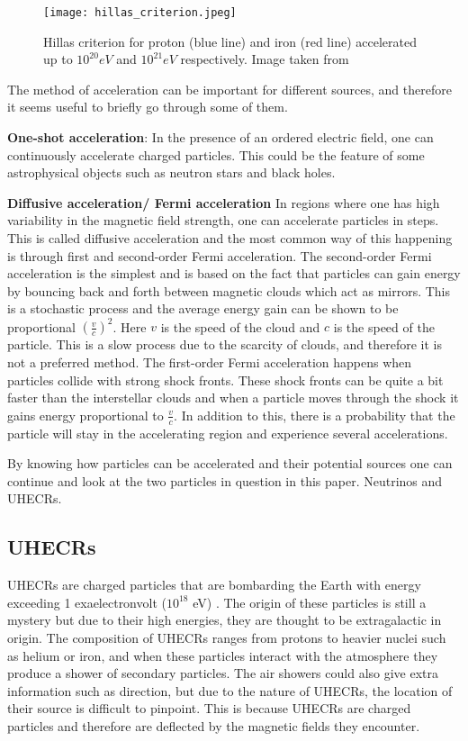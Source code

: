 \begin{figure}
    \centering
    \texttt{[image: hillas\_criterion.jpeg]}
    \caption{Hillas criterion for proton (blue line) and iron (red line) accelerated up to $10^{20}eV$ and $10^{21}eV$ respectively. Image taken from \cite{doi:10.1146/annurev-astro-081710-102620}}
    \label{fig:hillas_c}
\end{figure}

The method of acceleration can be important for different sources, and therefore it seems useful to briefly go through some of them.

\textbf{One-shot acceleration}:
In the presence of an ordered electric field, one can continuously accelerate charged particles. This could be the feature of some astrophysical objects such as neutron stars and black holes.%


\textbf{Diffusive acceleration/ Fermi acceleration}
In regions where one has high variability in the magnetic field strength, one can accelerate particles in steps. 
This is called diffusive acceleration and the most common way of this happening is through first and second-order Fermi acceleration.
The second-order Fermi acceleration is the simplest and is based on the fact that particles can gain energy by bouncing back and forth between magnetic clouds which act as mirrors. 
This is a stochastic process and the average energy gain can be shown to be proportional $(\frac{v}{c})^2$. Here $v$ is the speed of the cloud 
and $c$ is the speed of the particle. This is a slow process due to the scarcity of clouds, and therefore it is not a preferred method.
The first-order Fermi acceleration happens when particles collide with strong shock fronts. These shock fronts can be quite a bit faster than the interstellar clouds
and when a particle moves through the shock it gains energy proportional to $\frac{v}{c}$. In addition to this, there is a probability that the particle will stay in the accelerating region and 
experience several accelerations. 

By knowing how particles can be accelerated and their potential sources one can continue and look at the two particles in question in this paper. 
Neutrinos and UHECRs.
\subsection{UHECRs}

UHECRs are charged particles that are bombarding the Earth with energy exceeding 1 exaelectronvolt ($10^{18}$ eV) \cite{Alves_Batista_2019}. The origin of 
these particles is still a mystery but due to their high energies, they are thought to be extragalactic in origin.
The composition of UHECRs ranges from protons to heavier nuclei such as helium or iron, and when these particles interact with the atmosphere they produce a shower of secondary particles.
The air showers could also give extra information such as direction, but due to the nature of UHECRs, the location of their source is
difficult to pinpoint. This is because UHECRs are charged particles and therefore are deflected by the magnetic fields they encounter.

